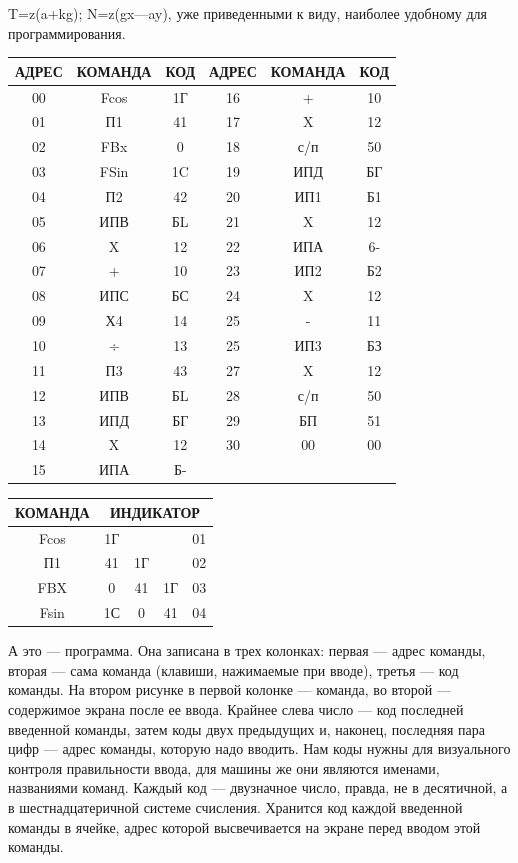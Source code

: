\documentclass[11pt,a4paper,oneside]{article}
\begin{document}
T=z(a+kg); N=z(gx—ay), уже приведенными к виду, наиболее удобному для программирования.

\begin{tabular}{|c|c|c|c|c|c|}\hline
АДРЕС & КОМАНДА & КОД & АДРЕС & КОМАНДА & КОД \\\hline
00 & Fcos & 1Г & 16 & + & 10 \\\hline
01 & П1 & 41 & 17 & X & 12 \\\hline
02 & FBx & 0 & 18 & с/п & 50 \\\hline
03 & FSin & 1C & 19 & ИПД & БГ \\\hline
04 & П2 & 42 & 20 & ИП1 & Б1 \\\hline
05 & ИПВ & БL & 21 & X & 12 \\\hline
06 & X & 12 & 22 & ИПА & 6- \\\hline
07 & + & 10 & 23 & ИП2 & Б2 \\\hline
08 & ИПС & БС & 24 & X & 12 \\\hline
09 & Х4 & 14 & 25 & - & 11 \\\hline
10 & ÷ & 13 & 25 & ИП3 & БЗ \\\hline
11 & П3 & 43 & 27 & X & 12 \\\hline
12 & ИПВ & БL & 28 & с/п & 50 \\\hline
13 & ИПД & БГ & 29 & БП & 51 \\\hline
14 & X & 12 & 30 & 00 & 00 \\\hline
15 & ИПА & Б- & & & \\\hline
\end{tabular}

\begin{tabular}{|c|c|c|c|c|}\hline
КОМАНДА & \multicolumn{4}{|c|}{ИНДИКАТОР} \\\hline
Fcos & 1Г & & & 01 \\
П1 & 41 & 1Г & & 02 \\
FBX & 0 & 41 & 1Г & 03 \\
Fsin & 1С & 0 & 41 & 04 \\\hline
\end{tabular}

А это — программа. Она записана в трех колонках: первая — адрес команды, вторая — сама команда (клавиши, нажимаемые при вводе), третья — код команды. На втором рисунке в первой колонке — команда, во второй — содержимое экрана после ее ввода. Крайнее слева число — код последней введенной команды, затем коды двух предыдущих и, наконец, последняя пара цифр — адрес команды, которую надо вводить. Нам коды нужны для визуального контроля правильности ввода, для машины же они являются именами, названиями команд. Каждый код — двузначное число, правда, не в десятичной, а в шестнадцатеричной системе счисления. Хранится код каждой введенной команды в ячейке, адрес которой высвечивается на экране перед вводом этой команды.
\end{document}
